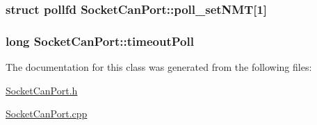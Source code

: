 \subsubsection[{\texorpdfstring{poll\+\_\+set\+N\+MT}{poll_setNMT}}]{\setlength{\rightskip}{0pt plus 5cm}struct pollfd Socket\+Can\+Port\+::poll\+\_\+set\+N\+MT\mbox{[}1\mbox{]}\hspace{0.3cm}{\ttfamily [private]}}\hypertarget{classSocketCanPort_afaaf9cd49684de93be7370988ec64b47}{}\label{classSocketCanPort_afaaf9cd49684de93be7370988ec64b47}
\subsubsection[{\texorpdfstring{timeout\+Poll}{timeoutPoll}}]{\setlength{\rightskip}{0pt plus 5cm}long Socket\+Can\+Port\+::timeout\+Poll\hspace{0.3cm}{\ttfamily [private]}}\hypertarget{classSocketCanPort_a18e670bf7f98482e022da2fd11264309}{}\label{classSocketCanPort_a18e670bf7f98482e022da2fd11264309}


The documentation for this class was generated from the following files\+:\begin{DoxyCompactItemize}
\item 
\hyperlink{SocketCanPort_8h}{Socket\+Can\+Port.\+h}\item 
\hyperlink{SocketCanPort_8cpp}{Socket\+Can\+Port.\+cpp}\end{DoxyCompactItemize}
